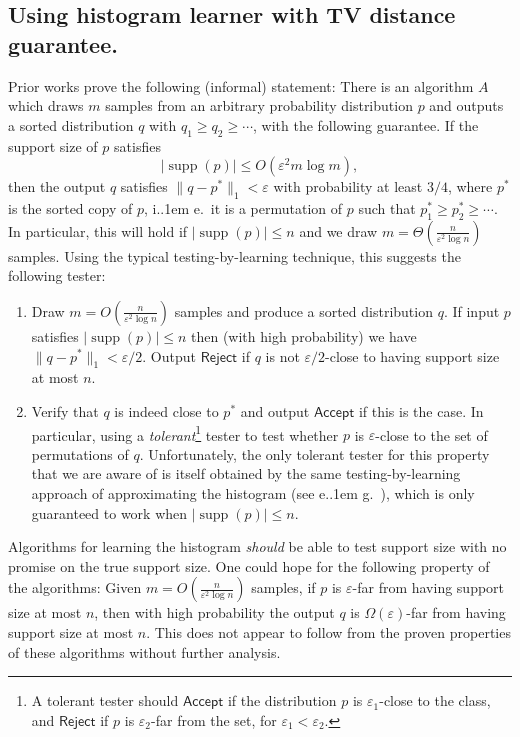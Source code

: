 \documentclass[10pt,a4paper]{article}
\newcommand*\ie{i.\kern.1em e.\ }
\newcommand*\eg{e.\kern.1em g.\ }
\DeclareMathOperator{\supp}{supp}   %
\newcommand{\ACCEPT}{\mathsf{Accept}}
\newcommand{\REJECT}{\mathsf{Reject}}
\renewcommand{\epsilon}{\varepsilon}
\begin{document}
\subsection{Using histogram learner with TV distance guarantee.}
Prior works \cite{VV11stoc,VV17,HJW18} prove the following (informal) statement: There is an algorithm $A$
which draws $m$ samples from an arbitrary probability distribution $p$
and outputs a sorted distribution $q$ with $q_1 \geq q_2 \geq \dotsm$, with the following guarantee.  If
the support size of $p$ satisfies
\[
  |\supp(p)| \leq O\left( \epsilon^2 m \log m \right),
\]
then the output $q$ satisfies $\|q - p^* \|_1 < \epsilon$ with probability at least $3/4$, where
$p^*$ is the sorted copy of $p$, \ie it is a permutation of $p$ such that $p^*_1 \geq p^*_2 \geq
\dotsm$. In particular, this will hold if $|\supp(p)| \leq n$ and we draw $m = \Theta(
\tfrac{n}{\epsilon^2 \log n})$ samples. Using the typical testing-by-learning technique, this
suggests the following tester:
\begin{enumerate}
\item Draw $m = O( \tfrac{n}{\epsilon^2 \log n} )$ samples and produce a sorted distribution
$q$. If input $p$ satisfies $|\supp(p)| \leq n$ then (with high probability) we have
$\|q - p^*\|_1 < \epsilon/2$. Output $\REJECT$ if $q$ is not $\epsilon/2$-close to
having support size at most $n$.
\item Verify that $q$ is indeed close to $p^*$ and output $\ACCEPT$ if this is the case. In
particular, using a \emph{tolerant}\footnote{A tolerant tester should $\ACCEPT$ if the distribution
$p$ is $\epsilon_1$-close to the class, and $\REJECT$ if $p$ is $\epsilon_2$-far from the set, for
$\epsilon_1 < \epsilon_2$.} tester to test whether $p$ is $\epsilon$-close to the set of
permutations of $q$. Unfortunately, the only tolerant tester for
this property that we are aware of is itself obtained by the same testing-by-learning approach of
approximating the histogram (see \eg \cite{Gol17}), which is only guaranteed to work when
$|\supp(p)| \leq n$.
\end{enumerate}
Algorithms for learning the histogram \emph{should} be able to test support size with no
promise on the true support size. One could hope for the following property of the algorithms: Given
$m = O\left(\tfrac{n}{\epsilon^2 \log n}\right)$ samples, if $p$ is $\epsilon$-far from having
support size at most $n$, then with high probability the output $q$ is $\Omega(\epsilon)$-far from
having support size at most $n$. This does not appear to follow from the proven properties of these
algorithms without further analysis. 
\end{document}
